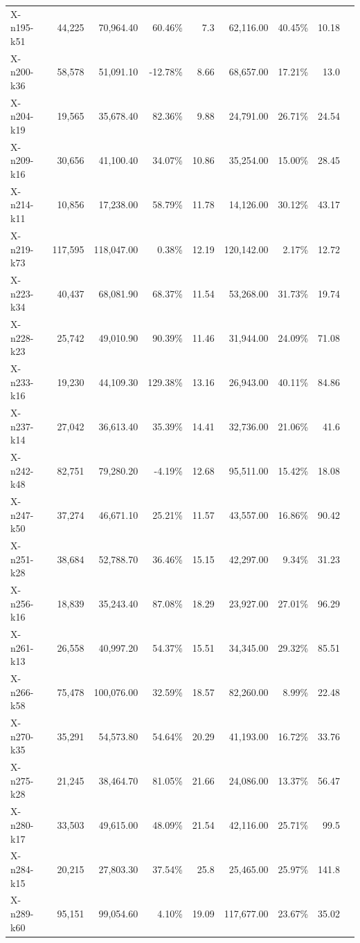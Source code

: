 \documentclass[12pt,a4paper]{article}
\begin{document}
\begin{longtable}{@{}lrrrrrrrr@{}}
    X-n195-k51 & 44,225 & 70,964.40 & 60.46\% & 7.3 & 62,116.00 & 40.45\% & 10.18 \\
    X-n200-k36 & 58,578 & 51,091.10 & -12.78\% & 8.66 & 68,657.00 & 17.21\% & 13.0 \\
    X-n204-k19 & 19,565 & 35,678.40 & 82.36\% & 9.88 & 24,791.00 & 26.71\% & 24.54 \\
    X-n209-k16 & 30,656 & 41,100.40 & 34.07\% & 10.86 & 35,254.00 & 15.00\% & 28.45 \\
    X-n214-k11 & 10,856 & 17,238.00 & 58.79\% & 11.78 & 14,126.00 & 30.12\% & 43.17 \\
    X-n219-k73 & 117,595 & 118,047.00 & 0.38\% & 12.19 & 120,142.00 & 2.17\% & 12.72 \\
    X-n223-k34 & 40,437 & 68,081.90 & 68.37\% & 11.54 & 53,268.00 & 31.73\% & 19.74 \\
    X-n228-k23 & 25,742 & 49,010.90 & 90.39\% & 11.46 & 31,944.00 & 24.09\% & 71.08 \\
    X-n233-k16 & 19,230 & 44,109.30 & 129.38\% & 13.16 & 26,943.00 & 40.11\% & 84.86 \\
    X-n237-k14 & 27,042 & 36,613.40 & 35.39\% & 14.41 & 32,736.00 & 21.06\% & 41.6 \\
    X-n242-k48 & 82,751 & 79,280.20 & -4.19\% & 12.68 & 95,511.00 & 15.42\% & 18.08 \\
    X-n247-k50 & 37,274 & 46,671.10 & 25.21\% & 11.57 & 43,557.00 & 16.86\% & 90.42 \\
    X-n251-k28 & 38,684 & 52,788.70 & 36.46\% & 15.15 & 42,297.00 & 9.34\% & 31.23 \\
    X-n256-k16 & 18,839 & 35,243.40 & 87.08\% & 18.29 & 23,927.00 & 27.01\% & 96.29 \\
    X-n261-k13 & 26,558 & 40,997.20 & 54.37\% & 15.51 & 34,345.00 & 29.32\% & 85.51 \\
    X-n266-k58 & 75,478 & 100,076.00 & 32.59\% & 18.57 & 82,260.00 & 8.99\% & 22.48 \\
    X-n270-k35 & 35,291 & 54,573.80 & 54.64\% & 20.29 & 41,193.00 & 16.72\% & 33.76 \\
    X-n275-k28 & 21,245 & 38,464.70 & 81.05\% & 21.66 & 24,086.00 & 13.37\% & 56.47 \\
    X-n280-k17 & 33,503 & 49,615.00 & 48.09\% & 21.54 & 42,116.00 & 25.71\% & 99.5 \\
    X-n284-k15 & 20,215 & 27,803.30 & 37.54\% & 25.8 & 25,465.00 & 25.97\% & 141.8 \\
    X-n289-k60 & 95,151 & 99,054.60 & 4.10\% & 19.09 & 117,677.00 & 23.67\% & 35.02 \\

\end{longtable}
\end{document}
